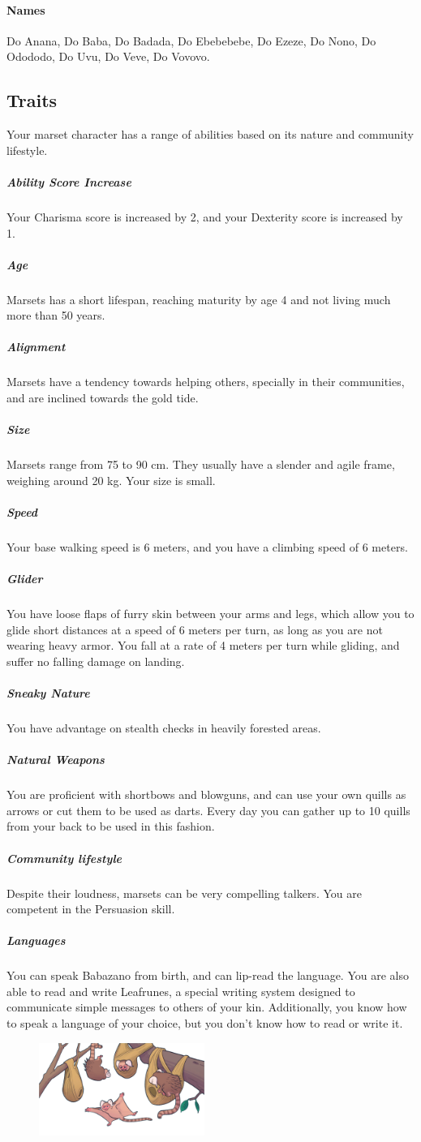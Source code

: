     \paragraph{Names}
    Do Anana, Do Baba, Do Badada, Do Ebebebebe, Do Ezeze, Do Nono, Do Odododo, Do Uvu, Do Veve, Do Vovovo.

\subsection*{Traits}
    Your marset character has a range of abilities based on its nature and community lifestyle.

    \subparagraph{Ability Score Increase} Your Charisma score is increased by 2, and your Dexterity score is increased by 1.

    \subparagraph{Age} Marsets has a short lifespan, reaching maturity by age 4 and not living much more than 50 years.

    \subparagraph{Alignment} Marsets have a tendency towards helping others, specially in their communities, and are inclined towards the gold tide.

    \subparagraph{Size} Marsets range from 75 to 90 cm.
    They usually have a slender and agile frame, weighing around 20 kg.
    Your size is small.

    \subparagraph{Speed} Your base walking speed is 6 meters, and you have a climbing speed of 6 meters.

    \subparagraph{Glider} You have loose flaps of furry skin between your arms and legs, which allow you to glide short distances at a speed of 6 meters per turn, as long as you are not wearing heavy armor.
    You fall at a rate of 4 meters per turn while gliding, and suffer no falling damage on landing.

    \subparagraph{Sneaky Nature} You have advantage on stealth checks in heavily forested areas.

    \subparagraph{Natural Weapons} You are proficient with shortbows and blowguns, and can use your own quills as arrows or cut them to be used as darts.
    Every day you can gather up to 10 quills from your back to be used in this fashion.

    \subparagraph{Community lifestyle} Despite their loudness, marsets can be very compelling talkers.
    You are competent in the Persuasion skill.

    \subparagraph{Languages} You can speak Babazano from birth, and can lip-read the language.
    You are also able to read and write Leafrunes, a special writing system designed to communicate simple messages to others of your kin.
    Additionally, you know how to speak a language of your choice, but you don't know how to read or write it.

\begin{figure}[!b]
    \centering
    \includegraphics[width=0.48\textwidth]{04kins/img/13marset_colony.png}
\end{figure}

\newpage
